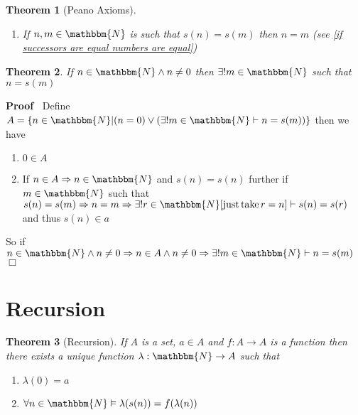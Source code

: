 \documentclass{book}
\newcommand{\nobracket}{}
\newcommand{\tmop}[1]{\ensuremath{\operatorname{#1}}}
\newenvironment{proof}{\noindent\textbf{Proof\ }}{\hspace*{\fill}$\Box$\medskip}
\newtheorem{theorem}{Theorem}
\begin{document}
{{\begin{theorem}[Peano Axioms]
\begin{enumerate}
    \item If $n, m \in \mathbbm{N}$ is such that $s (n) = s (m)$ then $n = m$
    (see \ref{if successors are equal numbers are equal})
  \end{enumerate}
\end{theorem}

\begin{theorem}
  \label{non zero element is a successor}If $n \in \mathbbm{N} \wedge n \neq
  0$ then $\exists !m \in \mathbbm{N}$ such that $n = s (m)$
\end{theorem}

\begin{proof}
  Define $A = \{ n \in \mathbbm{N} | (n = 0) \vee (\exists !m \in \mathbbm{N}
  \vdash n = s (m)) \nobracket \}$ then we have
  \begin{enumerate}
    \item $0 \in A$
    
    \item If $n \in A \Rightarrow n \in \mathbbm{N}$ and $s (n) = s (n)$
    further if $m \in \mathbbm{N}$ such that $s (n) = s (m) \Rightarrow n = m
    \Rightarrow \exists !r \in \mathbbm{N} [\tmop{just} \tmop{take} r = n]
    \vdash s (n) = s (r)$ and thus $s (n) \in a$
  \end{enumerate}
  So if $n \in \mathbbm{N} \wedge n \neq 0 \Rightarrow n \in A \wedge n \neq 0
  \Rightarrow \exists !m \in \mathbbm{N} \vdash n = s (m)$
\end{proof}

\section{Recursion}

\begin{theorem}[Recursion]
  \label{recursion}{}If $A$ is a set, $a \in A$ and $f : A
  \rightarrow A$ is a function then there exists a unique function $\lambda :
  \mathbbm{N} \rightarrow A$ such that
  \begin{enumerate}
    \item $\lambda (0) = a$
    
    \item $\forall n \in \mathbbm{N} \vDash \lambda (s (n)) = f (\lambda (n))$
  \end{enumerate}
\end{theorem}

}}
\end{document}
